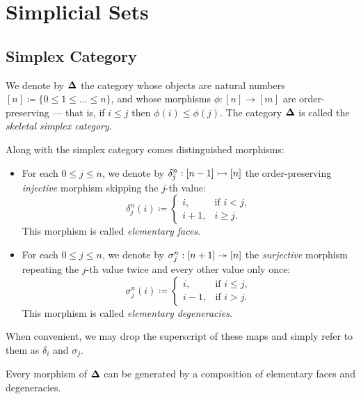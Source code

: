 \chapter{Simplicial Sets}

\section{Simplex Category}

\begin{definition}
\label{def:skeletal-simplex-category}
We denote by \({\mathbf{\Delta}}\) the category whose objects are natural numbers
\([n] \coloneq \{0 \leq 1 \leq \dots \leq n\}\), and whose morphisms
\(\phi: [n] \to [m]\) are order-preserving --- that is, if \(i \leq j\) then
\(\phi(i) \leq \phi(j)\). The category \({\mathbf{\Delta}}\) is called the \emph{skeletal
  simplex category}.

Along with the simplex category comes distinguished morphisms:
\begin{itemize}\setlength\itemsep{0em}
\item For each \(0 \leq j \leq n\), we denote by
  \(\delta_j^n: [n - 1] \rightarrowtail [n]\) the order-preserving \emph{injective}
  morphism skipping the \(j\)-th value:
  \[
  \delta_j^n(i) \coloneq
  \begin{cases}
    i, &\text{if } i < j, \\
    i + 1, &i \geq j.
  \end{cases}
  \]
  This morphism is called \emph{elementary faces}.

\item For each \(0 \leq j \leq n\), we denote by
  \(\sigma_j^n: [n + 1] \twoheadrightarrow [n]\) the \emph{surjective} morphism repeating the
  \(j\)-th value twice and every other value only once:
  \[
  \sigma_j^n(i) \coloneq
  \begin{cases}
    i, &\text{if } i \leq j, \\
    i - 1, &\text{if } i > j.
  \end{cases}
  \]
  This morphism is called \emph{elementary degeneracies}.
\end{itemize}
When convenient, we may drop the superscript of these maps and simply refer to
them as \(\delta_i\) and \(\sigma_j\).
\end{definition}

\begin{lemma}
\label{lem:elementary-maps-generate-simplex-maps}
Every morphism of \({\mathbf{\Delta}}\) can be generated by a composition of elementary
faces and degeneracies.
\end{lemma}

